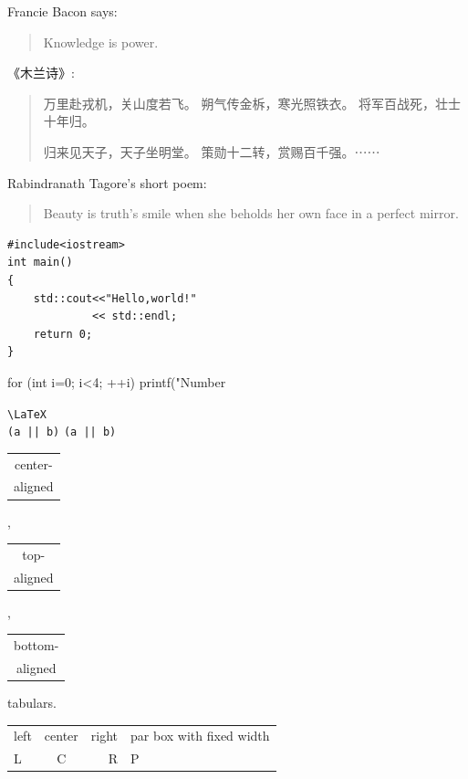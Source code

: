 \documentclass{ctexbook}
\begin{document}




Francie Bacon says:
\begin{quote}
    Knowledge is power.
\end{quote}

《木兰诗》:
\begin{quotation}
万里赴戎机，关山度若飞。
朔气传金柝，寒光照铁衣。
将军百战死，壮士十年归。

归来见天子，天子坐明堂。
策勋十二转，赏赐百千强。⋯⋯
\end{quotation}

Rabindranath Tagore's short poem:
\begin{verse}
Beauty is truth's smile
when she beholds her own face in a perfect mirror.
\end{verse}

\begin{verbatim}
#include<iostream>
int main()
{
    std::cout<<"Hello,world!"
             << std::endl;
    return 0;
}
\end{verbatim}

\begin{verbatim*}
for (int i=0; i<4; ++i)
  printf("Number %
\end{verbatim*}

\verb|\LaTeX|\\
\verb+(a || b)+ \verb*+(a || b)+

\begin{tabular}{|c|}
    center-\\aligned \\
\end{tabular},
\begin{tabular}[t]{|c|}
    top-\\aligned \\
\end{tabular},
\begin{tabular}[b]{|c|}
    bottom-\\aligned \\
\end{tabular} tabulars.

\begin{tabular}{lcr|p{6em}}
    \hline
    left & center & right
         & par box with fixed width\\
    L    & C      & R   & P\\
    \hline
\end{tabular}
\end{document}
